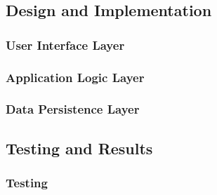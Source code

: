 \subsection{Design and Implementation}
\label{sec:designAndImplementation}


\subsubsection{User Interface Layer}



\subsubsection{Application Logic Layer}



\subsubsection{Data Persistence Layer}



\subsection{Testing and Results}
\label{sec:testingAndResults}

\subsubsection{Testing}


